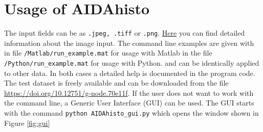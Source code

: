 \documentclass[12pt]{article}
\begin{document}
	
	
\section{Usage of AIDAhisto}
The input fields can be as {\tt .jpeg, .tiff} or {\tt .png}. \href{https://docs.scipy.org/doc/scipy/reference/generated/scipy.misc.imread.html}{Here} you can find detailed information about the image input. The command line examples are given with in file {\tt /Matlab/run\_example.mat} for usage with Matlab in the file {\tt /Python/run\_example.mat} for usage with Python.  and can be identically applied to other data. In both cases a detailed help is documented in the program code. The test dataset is freely available and  can be downloaded from the file \url{https://doi.org/10.12751/g-node.70e11f}. If the user does not want to work with the command line, a Generic User Interface (GUI) can be used. The GUI starts with the command {\tt python AIDAhisto\_gui.py} which opens the window shown in Figure \ref{fig:gui} 
\end{document}
